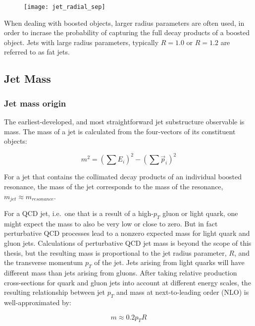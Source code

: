 \begin{figure}[h!]
    \centering
\texttt{[image: jet\_radial\_sep]}
\caption{}
\label{fig:jet_radial_sep}
\end{figure}

When dealing with boosted objects, larger radius parameters are often used, in order to incrase the probability
of capturing the full decay products of a boosted object.
Jets with large radius parameters, typically $R=1.0$ or $R=1.2$ are referred to as fat jets.

\subsection{Jet Mass}\label{subsec:jet_mass}

\subsubsection{Jet mass origin}

The earliest-developed, and most straightforward jet substructure observable is mass.
The mass of a jet is calculated from the four-vectors of its constituent objects:

\begin{equation}\label{eq:jet_mass}
    m^2 = \left(\sum E_i\right)^2 - \left(\sum \vec{p}_i \right)^2
\end{equation}

For a jet that contains the collimated decay products of an individual boosted resonance,
the mass of the jet corresponds to the mass of the resonance, $m_{jet} \approx m_{resonance}$.

For a QCD jet, i.e.\ one that is a result of a high-$p_T$ gluon or light quark, one might expect the mass to also be very low or close to zero.
But in fact perturbative QCD processes lead to a nonzero expected mass for light quark and gluon jets.
Calculations of perturbative QCD jet mass is beyond the scope of this thesis,
but the resulting mass is proportional to the jet radius parameter, $R$, and the transverse momentum $p_T$ of the jet.
Jets arising from light quarks will have different mass than jets arising from gluons.
After taking relative production cross-sections for quark and gluon jets into account at different energy scales,
the resulting relationship between jet $p_T$ and mass at next-to-leading order (NLO) is well-approximated by:

\begin{equation}\label{eq:jet_mass_nlo}
    m \approx 0.2 p_T R
\end{equation}\cite{jet-mass-nlo}

